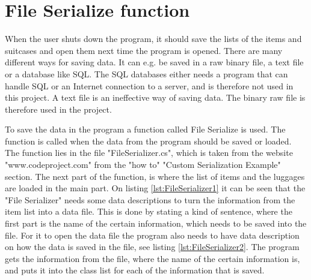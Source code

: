 \section{File Serialize function}
When the user shuts down the program, it should save the lists of the items and suitcases and open them next time the program is opened. There are many different ways for saving data. It can e.g. be saved in a raw binary file, a text file or a database like SQL.
The SQL databases either needs a program that can handle SQL or an Internet connection to a server, and is therefore not used in this project. A text file is an ineffective way of saving data. The binary raw file is therefore used in the project.

To save the data in the program a function called File Serialize is used. The function is called when the data from the program should be saved or loaded. The function lies in the file "FileSerializer.cs", which is taken from the website "www.codeproject.com" from the "how to" "Custom Serialization Example" section. The next part of the function, is where the list of items and the luggages are loaded in the main part.
On listing \ref{lst:FileSerializer1} it can be seen that the "File Serializer" needs some data descriptions to turn the information from the item list into a data file. This is done by stating a kind of sentence, where the first part is the name of the certain information, which needs to be saved into the file. 
For it to open the data file the program also needs to have data description on how the data is saved in the file, see listing \ref{lst:FileSerializer2}. The program gets the information from the file, where the name of the certain information is, and puts it into the class list for each of the information that is saved.
